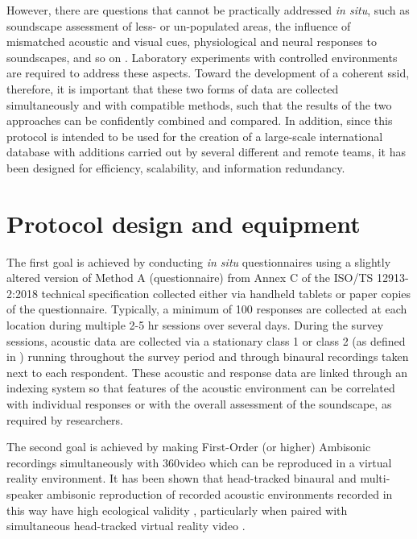  However, there are questions that cannot be practically addressed \textit{in situ}, such as soundscape assessment of less- or un-populated areas, the influence of mismatched acoustic and visual cues, physiological and neural responses to soundscapes, and so on \citep{Kogan2017comprehensive}. Laboratory experiments with controlled environments are required to address these aspects. Toward the development of a coherent \gls{ssid}, therefore, it is important that these two forms of data are collected simultaneously and with compatible methods, such that the results of the two approaches can be confidently combined and compared. In addition, since this protocol is intended to be used for the creation of a large-scale international database with additions carried out by several different and remote teams, it has been designed for efficiency, scalability, and information redundancy.

\section{Protocol design and equipment}
 The first goal is achieved by conducting \textit{in situ} questionnaires using a slightly altered version of Method A (questionnaire) from Annex C of the ISO/TS 12913-2:2018 technical specification \citep{ISO12913Part2} collected either via handheld tablets or paper copies of the questionnaire. Typically, a minimum of 100 responses are collected at each location during multiple 2-5 hr sessions over several days. During the survey sessions, acoustic data are collected via a stationary class 1 or class 2  (as defined in \citet{IEC61672Part1}) running throughout the survey period and through binaural recordings taken next to each respondent. These acoustic and response data are linked through an indexing system so that features of the acoustic environment can be correlated with individual responses or with the overall assessment of the soundscape, as required by researchers.

 The second goal is achieved by making First-Order (or higher) Ambisonic recordings simultaneously with 360\degree video which can be reproduced in a virtual reality environment. It has been shown that head-tracked binaural and multi-speaker ambisonic reproduction of recorded acoustic environments recorded in this way have high ecological validity \citep{Davies2014Soundscape}, particularly when paired with simultaneous head-tracked virtual reality video \citep{DeCoensel2017Urban,Hong2018Quality}.


